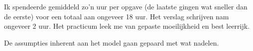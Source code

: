 
Ik spendeerde gemiddeld zo'n uur per opgave (de laatste gingen wat sneller dan de eerste) voor een totaal aan ongeveer 18 uur. Het verslag schrijven nam ongeveer 2 uur. Het practicum leek me van gepaste moeilijkheid en best leerrijk.\\

\par\noindent De assumpties inherent aan het model gaan gepaard met wat nadelen.